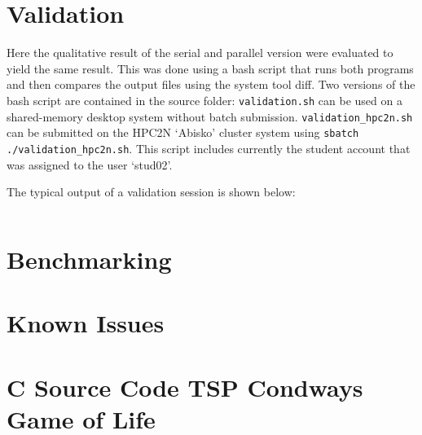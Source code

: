 \documentclass[a4paper,11pt,twoside]{article}
\begin{document}
\section{Validation}
Here the qualitative result of the serial and parallel version were evaluated to yield the same result. This was done using a bash script that runs both programs and then compares the output files using the system tool diff. Two versions of the bash script are contained in the source folder: \verb+validation.sh+ can be used on a shared-memory desktop system without batch submission. \verb+validation_hpc2n.sh+ can be submitted on the HPC2N `Abisko' cluster system using \verb+sbatch ./validation_hpc2n.sh+. This script includes currently the student account that was assigned to the user `stud02'.

The typical output of a validation session is shown below:
\begin{verbatim}

\end{verbatim}

\section{Benchmarking}

\section{Known Issues}



\appendix
\section{C Source Code TSP Condways Game of Life}{\label{app:gol}}
\end{document}
